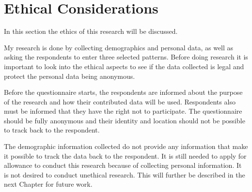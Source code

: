 \section{Ethical Considerations}
\label{sec:ethical}

    In this section the ethics of this research will be discussed. 

    My research is done by collecting demographics and personal data, as well as asking the respondents to enter three selected patterns. Before doing research it is important to look into the ethical aspects to see if the data collected is legal and protect the personal data being anonymous. 

    Before the questionnaire starts, the respondents are informed about the purpose of the research and how their contributed data will be used. Respondents also must be informed that they have the right not to participate. The questionnaire should be fully anonymous and their identity and location should not be possible to track back to the respondent. 

    The demographic information collected do not provide any information that make it possible to track the data back to the respondent. It is still needed to apply for allowance to conduct this research because of collecting personal information. It is not desired to conduct unethical research. This will further be described in the next Chapter for future work. 